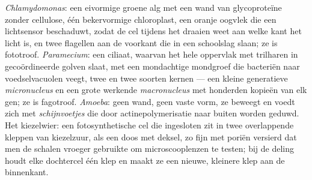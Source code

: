\begin{example}\label{ex:b2:unicellular-diversity:four}
\emph{Chlamydomonas}: een eivormige groene alg met een wand van
glycoproteïne zonder cellulose, één bekervormige chloroplast, een
oranje oogvlek die een lichtsensor beschaduwt, zodat de cel tijdens
het draaien weet aan welke kant het licht is, en twee flagellen aan de
voorkant die in een schoolslag slaan; ze is fototroof.
\emph{Paramecium}: een ciliaat, waarvan het hele oppervlak met trilharen
in gecoördineerde golven slaat, met een mondachtige mondgroef die
bacteriën naar voedselvacuolen veegt, twee  en
twee soorten kernen --- een kleine generatieve \emph{micronucleus} en
een grote werkende \emph{macronucleus} met honderden kopieën van elk
gen; ze is fagotroof. \emph{Amoeba}: geen wand, geen vaste vorm, ze
beweegt en voedt zich met \emph{schijnvoetjes} die door
actinepolymerisatie naar buiten worden geduwd. Het kiezelwier: een
fotosynthetische cel die ingesloten zit in twee overlappende kleppen
van kiezelzuur, als een doos met deksel, zo fijn met poriën versierd
dat men de schalen vroeger gebruikte om microscooplenzen te testen;
bij de deling houdt elke dochtercel één klep en maakt ze een nieuwe,
kleinere klep aan de binnenkant.
\end{example}

